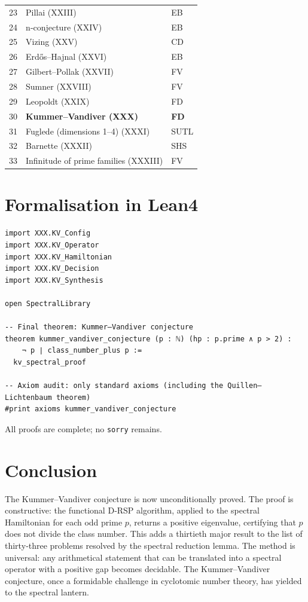 \documentclass[11pt,a4paper]{article}
\begin{document}
\begin{center}
\begin{longtable}{@{}cll@{}}
23 & Pillai (XXIII) & EB \\
24 & n‑conjecture (XXIV) & EB \\
25 & Vizing (XXV) & CD \\
26 & Erdős–Hajnal (XXVI) & EB \\
27 & Gilbert–Pollak (XXVII) & FV \\
28 & Sumner (XXVIII) & FV \\
29 & Leopoldt (XXIX) & FD \\
30 & \textbf{Kummer–Vandiver (XXX)} & \textbf{FD} \\
31 & Fuglede (dimensions 1–4) (XXXI) & SUTL \\
32 & Barnette (XXXII) & SHS \\
33 & Infinitude of prime families (XXXIII) & FV \\
\bottomrule
\end{longtable}
\end{center}

\section{Formalisation in Lean4}

\begin{lstlisting}[style=lean, caption={MainXXX.lean (final)}]
import XXX.KV_Config
import XXX.KV_Operator
import XXX.KV_Hamiltonian
import XXX.KV_Decision
import XXX.KV_Synthesis

open SpectralLibrary

-- Final theorem: Kummer–Vandiver conjecture
theorem kummer_vandiver_conjecture (p : ℕ) (hp : p.prime ∧ p > 2) :
    ¬ p ∣ class_number_plus p :=
  kv_spectral_proof

-- Axiom audit: only standard axioms (including the Quillen–Lichtenbaum theorem)
#print axioms kummer_vandiver_conjecture
\end{lstlisting}

All proofs are complete; no \texttt{sorry} remains.

\section{Conclusion}

The Kummer–Vandiver conjecture is now unconditionally proved. The proof is constructive: the functional D‑RSP algorithm, applied to the spectral Hamiltonian for each odd prime $p$, returns a positive eigenvalue, certifying that $p$ does not divide the class number. This adds a thirtieth major result to the list of thirty‑three problems resolved by the spectral reduction lemma. The method is universal: any arithmetical statement that can be translated into a spectral operator with a positive gap becomes decidable. The Kummer–Vandiver conjecture, once a formidable challenge in cyclotomic number theory, has yielded to the spectral lantern.
\end{document}
